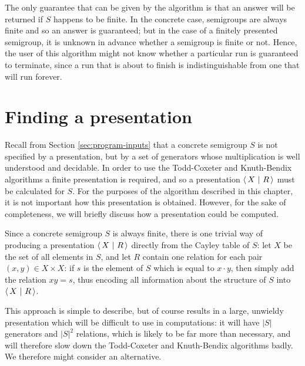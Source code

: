 The only guarantee that can be given by the algorithm is that an answer will be
returned if $S$ happens to be finite.  In the concrete case, semigroups are
always finite and so an answer is guaranteed; but in the case of a finitely
presented semigroup, it is unknown in advance whether a semigroup is finite or
not.  Hence, the user of this algorithm might not know whether a particular run
is guaranteed to terminate, since a run that is about to finish is
indistinguishable from one that will run forever.

\section{Finding a presentation}
\label{sec:find-pres}

Recall from Section \ref{sec:program-inputs} that a concrete semigroup $S$ is
not specified by a presentation, but by a set of generators whose multiplication
is well understood and decidable.  In order to use the Todd-Coxeter and
Knuth-Bendix algorithms a finite presentation is required, and so a presentation
$\left\langle\,X ~\middle|~ R\,\right\rangle$ must be calculated for $S$.  For the purposes of the algorithm
described in this chapter, it is not important how this presentation is
obtained.  However, for the sake of completeness, we will briefly discuss how a
presentation could be computed.

Since a concrete semigroup $S$ is always finite, there is one trivial way of
producing a presentation $\left\langle\,X ~\middle|~ R\,\right\rangle$ directly from the Cayley table of $S$: let
$X$ be the set of all elements in $S$, and let $R$ contain one relation for each
pair $(x,y) \in X \times X$: if $s$ is the element of $S$ which is equal to
$x \cdot y$, then simply add the relation $xy = s$, thus encoding all
information about the structure of $S$ into $\left\langle\,X ~\middle|~ R\,\right\rangle$.

This approach is simple to describe, but of course results in a large, unwieldy
presentation which will be difficult to use in computations: it will have $|S|$
generators and $|S|^2$ relations, which is likely to be far more than necessary,
and will therefore slow down the Todd-Coxeter and Knuth-Bendix algorithms
badly.  We therefore might consider an alternative.

